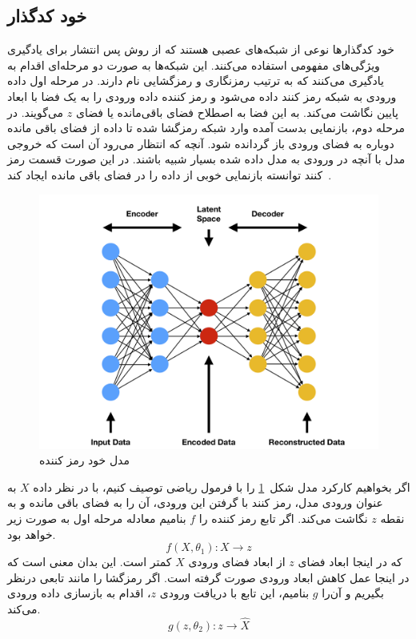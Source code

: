\documentclass[12pt,a4paper]{report}
\begin{document}
	\subsection{خود کدگذار}
	خود کدگذار‌ها نوعی از شبکه‌های عصبی هستند که از روش پس انتشار برای یادگیری ویژگی‌های مفهومی استفاده می‌کنند. این شبکه‌ها به صورت دو مرحله‌ای اقدام به یادگیری می‌کنند که به ترتیب رمزنگاری و رمزگشایی نام دارند. در مرحله اول داده ورودی به شبکه رمز کنند داده می‌شود و رمز کننده داده ورودی را به یک فضا با ابعاد پایین نگاشت می‌کند. به این فضا به اصطلاح فضای باقی‌مانده یا فضای $z$ می‌گویند. در مرحله دوم، بازنمایی بدست آمده وارد شبکه رمزگشا شده تا داده از فضای باقی مانده دوباره به فضای ورودی باز گردانده شود. آنچه که انتظار می‌رود آن است که خروجی مدل با آنچه در ورودی به مدل داده شده بسیار شبیه باشند. در این صورت قسمت رمز کنند توانسته بازنمایی خوبی از داده را در فضای باقی مانده ایجاد کند~\cite{BHUVANESHWARI2021131}.
\begin{figure}[!h]
	\begin{center}
		\includegraphics[width=0.6\linewidth]{./images/figures/ae.png}
	\end{center}
	\caption{مدل خود رمز کننده}
	\label{fig:ae}
	\centering
\end{figure}

اگر بخواهیم کارکرد مدل شکل~\ref{fig:ae} را با فرمول ریاضی توصیف کنیم، با در نظر داده $X$ به عنوان ورودی مدل، رمز کنند با گرفتن این ورودی، آن را به فضای باقی مانده و به نقطه $z$ نگاشت می‌کند. اگر تابع رمز کننده را $f$ بنامیم معادله مرحله اول به صورت زیر خواهد بود.
\begin{equation}
f(X, \theta_1): X \rightarrow z
\end{equation}
که در اینجا ابعاد فضای $z$ از ابعاد فضای ورودی $X$ کمتر است. این بدان معنی است که در اینجا عمل کاهش ابعاد ورودی صورت گرفته است. اگر رمزگشا را مانند تابعی درنظر بگیریم و آن‌را $g$ بنامیم، این تابع با دریافت ورودی $z$، اقدام به بازسازی داده ورودی می‌کند.
\begin{equation}
	g(z, \theta_2): z \rightarrow \hat{X}
\end{equation}
\end{document}
